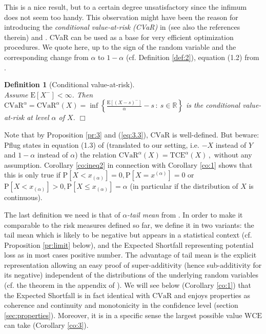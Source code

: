 \documentclass[11pt,a4paper,leqno]{article}
\newtheorem{definition}[theorem]{Definition}
\begin{document}
This is a  nice result, but to a certain degree unsatisfactory since the infimum
does not seem too handy. This observation might have been the reason for introducing
the \emph{conditional value-at-risk (CVaR)} in \cite{Ur00} (see also
the references therein) and \cite{Pf00}. CVaR can be used as a base for very efficient optimization 
procedures. We quote here, up to the sign of the random variable and the 
corresponding change from $\alpha$ to $1 - \alpha$ (cf. Definition \ref{def:2}), equation (1.2) from \cite{Pf00}.

\begin{definition}[Conditional value-at-risk]
\label{def:5}\ \\
Assume $\mathrm{E}[X^-] < \infty$. Then
$\mathrm{CVaR}^\alpha = \mathrm{CVaR}^\alpha(X) =  \inf \left\{ \frac{\mathrm{E}[ (X - s)^- ]}{\alpha} - s \,:\ s \in \mathbb{R}
\right\}$ is the \emph{conditional value-at-risk} at level $\alpha$ of $X$.
\hfill $\Box$
\end{definition}
%
Note that  by Proposition \ref{pr:3} and (\ref{eq:3.3}), $\mathrm{CVaR}$ is well-defined.
But beware: Pflug states  in equation (1.3) of \cite{Pf00}  (translated to our setting, i.e.
$-X$ instead of $Y$ and $1 - \alpha$ instead of $\alpha$) the relation
$
\mathrm{CVaR}^\alpha(X) =  \mathrm{TCE}^\alpha(X)\,,
$
without any assumption.
Corollary \ref{co:ineq2} in connection with Corollary \ref{co:1} shows that this is only true 
if $\mathrm{P}[X < x_{(\alpha)}] = 0, \mathrm{P}[X = x^{(\alpha)}] = 0$ or $\mathrm{P}[X < x_{(\alpha)}] > 0, 
\mathrm{P}[X \le x_{(\alpha)}] = \alpha$ (in particular if the distribution of $X$ is continuous).

The last definition we need is that of \emph{$\alpha$-tail mean} from \cite{ANS}. In order to make
it comparable to the risk measures defined so far, we define it in two variants: the tail mean which is likely
to be negative but appears in a statistical context (cf. Proposition \ref{pr:limit} below), and the Expected Shortfall representing
potential loss as in most cases positive number.
The advantage of tail mean is the explicit representation allowing an easy proof of super-additivity (hence sub-additivity for its
negative)
independent of the distributions of the underlying random variables (cf. the theorem in the
appendix of \cite{ANS}). We will see below (Corollary \ref{co:1}) that the Expected Shortfall is in fact identical with
$\mathrm{CVaR}$ and enjoys properties  as coherence and continuity and
monotonicity in the 
confidence level (section \ref{sec:properties}). Moreover, it is in a specific
sense the largest possible value $\mathrm{WCE}$ can take (Corollary \ref{co:3}).
\end{document}
